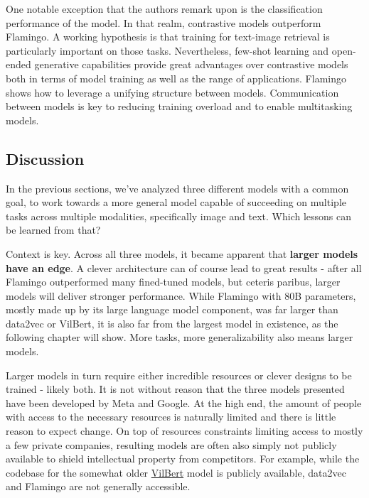 \documentclass[
]{krantz}
\begin{document}
One notable exception that the authors remark upon is the classification performance of the model. In that realm, contrastive models outperform Flamingo. A working hypothesis is that training for text-image retrieval is particularly important on those tasks. Nevertheless, few-shot learning and open-ended generative capabilities provide great advantages over contrastive models both in terms of model training as well as the range of applications. Flamingo shows how to leverage a unifying structure between models. Communication between models is key to reducing training overload and to enable multitasking models.

\hypertarget{discussion-2}{%
\subsection{Discussion}\label{discussion-2}}

In the previous sections, we've analyzed three different models with a common goal, to work towards a more general model capable of succeeding on multiple tasks across multiple modalities, specifically image and text. Which lessons can be learned from that?

Context is key. Across all three models, it became apparent that \textbf{larger models have an edge}. A clever architecture can of course lead to great results - after all Flamingo outperformed many fined-tuned models, but ceteris paribus, larger models will deliver stronger performance. While Flamingo with 80B parameters, mostly made up by its large language model component, was far larger than data2vec or VilBert, it is also far from the largest model in existence, as the following chapter will show. More tasks, more generalizability also means larger models.

Larger models in turn require either incredible resources or clever designs to be trained - likely both. It is not without reason that the three models presented have been developed by Meta and Google. At the high end, the amount of people with access to the necessary resources is naturally limited and there is little reason to expect change. On top of resources constraints limiting access to mostly a few private companies, resulting models are often also simply not publicly available to shield intellectual property from competitors. For example, while the codebase for the somewhat older \href{https://github.com/facebookresearch/vilbert-multi-task}{VilBert} model is publicly available, data2vec and Flamingo are not generally accessible.
\end{document}
